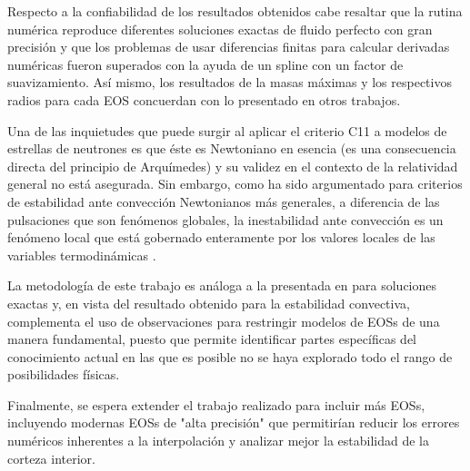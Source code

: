 Respecto a la confiabilidad de los resultados obtenidos cabe resaltar que la rutina numérica reproduce diferentes soluciones exactas de fluido perfecto con gran precisión y que los problemas de usar diferencias finitas para calcular derivadas numéricas fueron superados con la ayuda de un spline con un factor de suavizamiento. Así mismo, los resultados de la masas máximas y los respectivos radios para cada EOS concuerdan con lo presentado en otros trabajos.

Una de las inquietudes que puede surgir al aplicar el criterio C11 a modelos de estrellas de neutrones es que éste es Newtoniano en esencia (es una consecuencia directa del principio de Arquímedes) y su validez en el contexto de la relatividad general no está asegurada. Sin embargo, como ha sido argumentado para criterios de estabilidad ante convección Newtonianos más generales, a diferencia de las pulsaciones que son fenómenos globales, la inestabilidad ante convección es un fenómeno local que está gobernado enteramente por los valores locales de las variables termodinámicas \cite{Thorne1966}.    

La metodología de este trabajo es análoga a la presentada en \cite{Delgaty1998} para soluciones exactas y, en vista del resultado obtenido para la estabilidad convectiva, complementa el uso de observaciones para restringir modelos de EOSs de una manera fundamental, puesto que permite identificar partes específicas del conocimiento actual en las que es posible no se haya explorado todo el rango de posibilidades físicas.

Finalmente, se espera extender el trabajo realizado para incluir más EOSs, incluyendo modernas EOSs de "alta precisión" que permitirían reducir los errores numéricos inherentes a la interpolación y analizar mejor la estabilidad de la corteza interior.